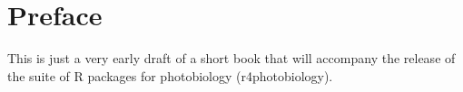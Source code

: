 \chapter{Preface}

This is just a very early draft of a short book that will accompany the release of the suite of R packages for photobiology (\textsf{r4photobiology}).
